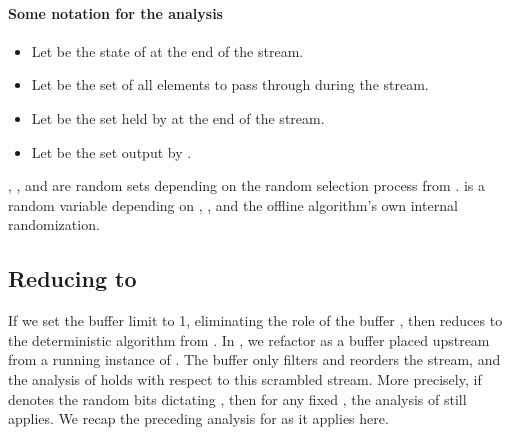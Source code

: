\documentclass[oneside,letterpaper]{scrartcl} \usepackage{macros}
\begin{document}
\paragraph{Some notation for the analysis}

\begin{itemize}
\item Let  be the state of  at the end of the stream.
\item Let  be the set of all elements to pass through 
  during the stream.
\item Let  be the set held by  at the end of
  the stream.
\item Let  be
  the set output by .
\end{itemize}
, , and  are random sets depending
on the random selection process from .  is a random
variable depending on , , and the offline
algorithm's own internal randomization.


\subsection{Reducing to }

If we set the buffer limit  to 1, eliminating the role of the
buffer , then  reduces
to the deterministic  algorithm from
. In
, we refactor
as a buffer placed upstream from a running instance of
. The buffer only filters and reorders the
stream, and the analysis of  holds with
respect to this scrambled stream.  More precisely, if  denotes the
random bits dictating , then for any fixed , the analysis
of  still applies. We recap the preceding
analysis for  as it applies here.
\end{document}
